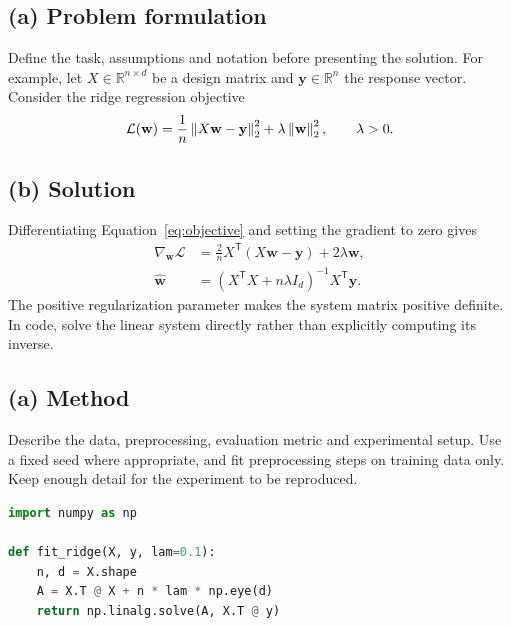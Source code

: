 \documentclass[a4paper,11pt]{article}
\begin{document}
\makeassignmenttitle

\subsection*{(a) Problem formulation}
Define the task, assumptions and notation before presenting the solution.
For example, let $X\in\mathbb{R}^{n\times d}$ be a design matrix and
$\mathbf{y}\in\mathbb{R}^{n}$ the response vector. Consider the ridge
regression objective
\begin{equation}
  \mathcal{L}(\mathbf{w}) = \frac{1}{n}\left\lVert X\mathbf{w}-\mathbf{y}\right\rVert_2^2
  + \lambda\left\lVert\mathbf{w}\right\rVert_2^2, \qquad \lambda>0.
  \label{eq:objective}
\end{equation}

\subsection*{(b) Solution}
Differentiating Equation~\eqref{eq:objective} and setting the gradient to
zero gives
\begin{align}
  \nabla_{\mathbf{w}}\mathcal{L}
    &= \frac{2}{n}X^{\mathsf T}(X\mathbf{w}-\mathbf{y})+2\lambda\mathbf{w},\\
  \widehat{\mathbf{w}}
    &= (X^{\mathsf T}X+n\lambda I_d)^{-1}X^{\mathsf T}\mathbf{y}.
\end{align}
The positive regularization parameter makes the system matrix positive
definite. In code, solve the linear system directly rather than explicitly
computing its inverse.

\subsection*{(a) Method}
Describe the data, preprocessing, evaluation metric and experimental setup.
Use a fixed seed where appropriate, and fit preprocessing steps on training
data only. Keep enough detail for the experiment to be reproduced.

\begin{lstlisting}[language=Python,float=htbp,caption={A minimal ridge regression implementation.},label={lst:ridge}]
import numpy as np

def fit_ridge(X, y, lam=0.1):
    n, d = X.shape
    A = X.T @ X + n * lam * np.eye(d)
    return np.linalg.solve(A, X.T @ y)
\end{lstlisting}
\end{document}
